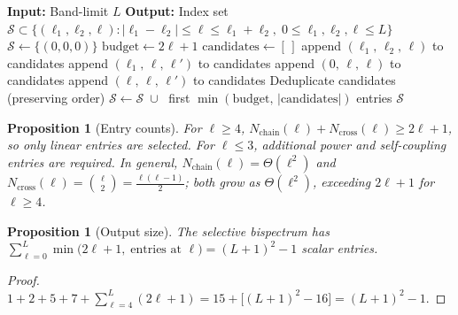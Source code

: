 \documentclass{article}
\newtheorem{proposition}[theorem]{Proposition}
\newcommand{\SO}{\mathrm{SO}}
\begin{document}
\begin{algorithm}[t]
\caption{Selective index set $\mathcal{S}$ for the $\SO(3)$ bispectrum
  on $S^2$ at band-limit~$L$.}
\label{alg:app-selective}
\small
\begin{algorithmic}[1]
\STATE \textbf{Input:} Band-limit $L$
\STATE \textbf{Output:} Index set
  $\mathcal{S} \subset \{(\ell_1,\ell_2,\ell) :
  |\ell_1-\ell_2| \le \ell \le \ell_1+\ell_2,\;
  0 \le \ell_1,\ell_2,\ell \le L\}$
\STATE $\mathcal{S} \leftarrow \{(0,0,0)\}$
  \STATE $\text{budget} \leftarrow 2\ell + 1$
  \STATE $\text{candidates} \leftarrow [\,]$
  \STATE {}
        \STATE append $(\ell_1,\, \ell_2,\, \ell)$ to candidates
      \ENDIF
    \ENDFOR
  \ENDFOR
  \STATE {}
      \STATE append $(\ell_1,\, \ell,\, \ell')$ to candidates
    \ENDFOR
  \ENDFOR
  \STATE {}
  \STATE append $(0,\, \ell,\, \ell)$ to candidates
  \STATE {}
    \STATE append $(\ell,\, \ell,\, \ell')$ to candidates
  \ENDFOR
  \STATE Deduplicate candidates (preserving order)
  \STATE $\mathcal{S} \leftarrow \mathcal{S}
    \;\cup\;$ first $\min(\text{budget},\,
    |\text{candidates}|)$ entries
\ENDFOR
\RETURN $\mathcal{S}$
\end{algorithmic}
\end{algorithm}

\begin{proposition}[Entry counts]\label{prop:app-entry-counts}
For $\ell \ge 4$,
$N_{\mathrm{chain}}(\ell) + N_{\mathrm{cross}}(\ell) \ge 2\ell + 1$,
so only linear entries are selected. For $\ell \le 3$, additional power
and self-coupling entries are required.
In general, $N_{\mathrm{chain}}(\ell) = \Theta(\ell^2)$
and $N_{\mathrm{cross}}(\ell) = \binom{\ell}{2} =
\frac{\ell(\ell-1)}{2}$; both grow as $\Theta(\ell^2)$,
exceeding $2\ell+1$ for $\ell \ge 4$.
\end{proposition}

\begin{proposition}[Output size]\label{prop:app-output-size}
The selective bispectrum has
$\sum_{\ell=0}^{L} \min\bigl(2\ell+1,\;
    \text{entries at } \ell\bigr)
  = (L+1)^2 - 1$
scalar entries.
\end{proposition}
\begin{proof}
$1 + 2 + 5 + 7 + \sum_{\ell=4}^{L}(2\ell+1)
= 15 + \bigl[(L+1)^2 - 16\bigr] = (L+1)^2 - 1$.
\end{proof}
\end{document}
